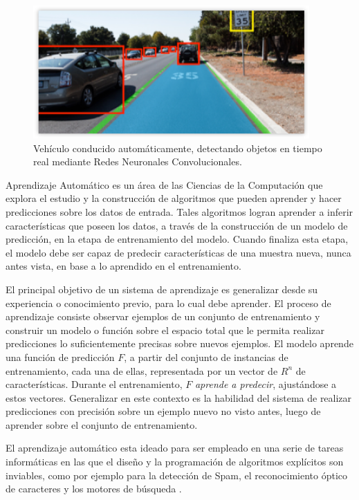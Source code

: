 \documentclass[a4paper,11pt,spanish]{book}
\begin{document}
    \begin{figure}[h]
      \includegraphics[width=0.9\linewidth]{./img/nvidia_car_detection.png}
      \caption{Vehículo conducido automáticamente, detectando objetos en tiempo real mediante Redes Neuronales Convolucionales.}
      \label{fig:car_detection}
    \end{figure}
    
    Aprendizaje Automático es un área de las Ciencias de la Computación que explora el estudio y la construcción de algoritmos que pueden aprender y hacer 
    predicciones sobre los datos de entrada.
    Tales algoritmos logran aprender a inferir características que poseen los datos, a través de la construcción de un modelo de predicción, en la etapa de entrenamiento 
    del modelo.
    Cuando finaliza esta etapa, el modelo debe ser capaz de predecir características de una muestra nueva, nunca antes vista, en base a lo aprendido en el entrenamiento.

    El principal objetivo de un sistema de aprendizaje es generalizar desde su experiencia o conocimiento previo, para lo cual debe aprender.
    El proceso de aprendizaje consiste observar ejemplos de un conjunto de entrenamiento y construir un modelo o función sobre el espacio total que le permita realizar 
    predicciones lo suficientemente precisas sobre nuevos ejemplos. 
    El modelo aprende una función de predicción $F$, a partir del conjunto de instancias de entrenamiento, cada una de ellas, representada por un vector de $R^n$ de características.  
    Durante el entrenamiento, $F$  \emph{aprende a predecir}, ajustándose a estos vectores.
    Generalizar en este contexto es la habilidad del sistema de realizar predicciones con precisión sobre un ejemplo nuevo no visto antes, 
    luego de aprender sobre el conjunto de entrenamiento. 
    
    El aprendizaje automático esta ideado para ser empleado en una serie de tareas informáticas en las que el diseño y la programación de algoritmos explícitos son inviables,
    como por ejemplo para la detección de Spam, el reconocimiento óptico de caracteres y los motores de búsqueda \cite{Bishop:MachineLearning}.
\end{document}
